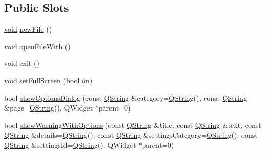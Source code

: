 \subsection*{\-Public \-Slots}
\begin{DoxyCompactItemize}
\item 
\hyperlink{group___u_a_v_objects_plugin_ga444cf2ff3f0ecbe028adce838d373f5c}{void} \hyperlink{group___core_plugin_ga69f73b93cc05c89a9ae1be0161105982}{new\-File} ()
\item 
\hyperlink{group___u_a_v_objects_plugin_ga444cf2ff3f0ecbe028adce838d373f5c}{void} \hyperlink{group___core_plugin_ga6b2e95592588842489c28905b25548c4}{open\-File\-With} ()
\item 
\hyperlink{group___u_a_v_objects_plugin_ga444cf2ff3f0ecbe028adce838d373f5c}{void} \hyperlink{group___core_plugin_ga627d7b538a0d60645e6c339bd787eeee}{exit} ()
\item 
\hyperlink{group___u_a_v_objects_plugin_ga444cf2ff3f0ecbe028adce838d373f5c}{void} \hyperlink{group___core_plugin_gac3795529e7fd028195be00ec0187e6d5}{set\-Full\-Screen} (bool on)
\item 
bool \hyperlink{group___core_plugin_ga18a22906e317f7beddef59f9557a80ee}{show\-Options\-Dialog} (const \hyperlink{group___u_a_v_objects_plugin_gab9d252f49c333c94a72f97ce3105a32d}{\-Q\-String} \&category=\hyperlink{group___u_a_v_objects_plugin_gab9d252f49c333c94a72f97ce3105a32d}{\-Q\-String}(), const \hyperlink{group___u_a_v_objects_plugin_gab9d252f49c333c94a72f97ce3105a32d}{\-Q\-String} \&page=\hyperlink{group___u_a_v_objects_plugin_gab9d252f49c333c94a72f97ce3105a32d}{\-Q\-String}(), \-Q\-Widget $\ast$parent=0)
\item 
bool \hyperlink{group___core_plugin_gaf0d1f8838353576747cfa4b184a6b2f4}{show\-Warning\-With\-Options} (const \hyperlink{group___u_a_v_objects_plugin_gab9d252f49c333c94a72f97ce3105a32d}{\-Q\-String} \&title, const \hyperlink{group___u_a_v_objects_plugin_gab9d252f49c333c94a72f97ce3105a32d}{\-Q\-String} \&text, const \hyperlink{group___u_a_v_objects_plugin_gab9d252f49c333c94a72f97ce3105a32d}{\-Q\-String} \&details=\hyperlink{group___u_a_v_objects_plugin_gab9d252f49c333c94a72f97ce3105a32d}{\-Q\-String}(), const \hyperlink{group___u_a_v_objects_plugin_gab9d252f49c333c94a72f97ce3105a32d}{\-Q\-String} \&settings\-Category=\hyperlink{group___u_a_v_objects_plugin_gab9d252f49c333c94a72f97ce3105a32d}{\-Q\-String}(), const \hyperlink{group___u_a_v_objects_plugin_gab9d252f49c333c94a72f97ce3105a32d}{\-Q\-String} \&settings\-Id=\hyperlink{group___u_a_v_objects_plugin_gab9d252f49c333c94a72f97ce3105a32d}{\-Q\-String}(), \-Q\-Widget $\ast$parent=0)
\end{DoxyCompactItemize}
